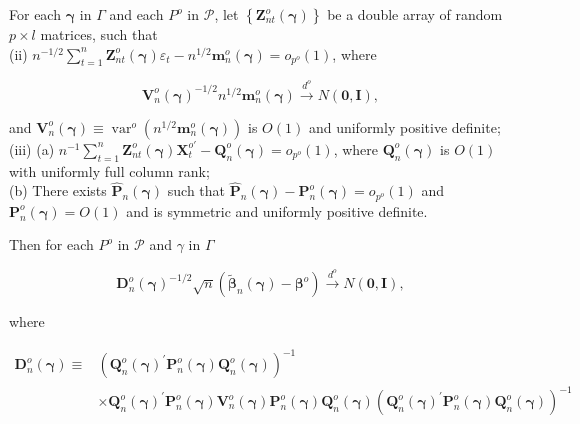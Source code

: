 \documentclass[10pt]{article}
\begin{document}
For each $\boldsymbol{\gamma}$ in $\Gamma$ and each $P^{o}$ in $\mathcal{P}$, let $\left\{\mathbf{Z}_{n t}^{o}(\boldsymbol{\gamma})\right\}$ be a double array of random $p \times l$ matrices, such that\\
(ii) $n^{-1 / 2} \sum_{t=1}^{n} \mathbf{Z}_{n t}^{o}(\boldsymbol{\gamma}) \varepsilon_{t}-n^{1 / 2} \mathbf{m}_{n}^{o}(\boldsymbol{\gamma})=o_{p^{o}}(1)$, where

$$
\mathbf{V}_{n}^{o}(\boldsymbol{\gamma})^{-1 / 2} n^{1 / 2} \mathbf{m}_{n}^{o}(\boldsymbol{\gamma}) \xrightarrow{d^{o}} N(\mathbf{0}, \mathbf{I}),
$$

and $\mathbf{V}_{n}^{o}(\boldsymbol{\gamma}) \equiv \operatorname{var}^{o}\left(n^{1 / 2} \mathbf{m}_{n}^{o}(\boldsymbol{\gamma})\right)$ is $O(1)$ and uniformly positive definite;\\
(iii) (a) $n^{-1} \sum_{t=1}^{n} \mathbf{Z}_{n t}^{o}(\boldsymbol{\gamma}) \mathbf{X}_{t}^{o \prime}-\mathbf{Q}_{n}^{o}(\boldsymbol{\gamma})=o_{p^{o}}(1)$, where $\mathbf{Q}_{n}^{o}(\boldsymbol{\gamma})$ is $O(1)$ with uniformly full column rank;\\
(b) There exists $\hat{\mathbf{P}}_{n}(\boldsymbol{\gamma})$ such that $\hat{\mathbf{P}}_{n}(\boldsymbol{\gamma})-\mathbf{P}_{n}^{o}(\boldsymbol{\gamma})=o_{p^{o}}(1)$ and $\mathbf{P}_{n}^{o}(\boldsymbol{\gamma})= O(1)$ and is symmetric and uniformly positive definite.

Then for each $P^{o}$ in $\mathcal{P}$ and $\gamma$ in $\Gamma$

$$
\mathbf{D}_{n}^{o}(\boldsymbol{\gamma})^{-1 / 2} \sqrt{n}\left(\tilde{\boldsymbol{\beta}}_{n}(\boldsymbol{\gamma})-\boldsymbol{\beta}^{o}\right) \xrightarrow{d^{o}} N(\mathbf{0}, \mathbf{I}),
$$

where

$$
\begin{aligned}
\mathbf{D}_{n}^{o}(\boldsymbol{\gamma}) \equiv & \left(\mathbf{Q}_{n}^{o}(\boldsymbol{\gamma})^{\prime} \mathbf{P}_{n}^{o}(\boldsymbol{\gamma}) \mathbf{Q}_{n}^{o}(\boldsymbol{\gamma})\right)^{-1} \\
& \times \mathbf{Q}_{n}^{o}(\boldsymbol{\gamma})^{\prime} \mathbf{P}_{n}^{o}(\boldsymbol{\gamma}) \mathbf{V}_{n}^{o}(\boldsymbol{\gamma}) \mathbf{P}_{n}^{o}(\boldsymbol{\gamma}) \mathbf{Q}_{n}^{o}(\boldsymbol{\gamma})\left(\mathbf{Q}_{n}^{o}(\boldsymbol{\gamma})^{\prime} \mathbf{P}_{n}^{o}(\boldsymbol{\gamma}) \mathbf{Q}_{n}^{o}(\boldsymbol{\gamma})\right)^{-1}
\end{aligned}
$$
\end{document}
